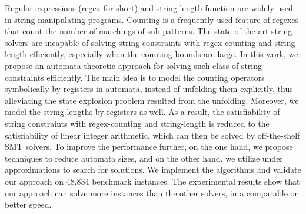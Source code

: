 
%

Regular expressions (regex for short) and string-length function are widely used in string-manipulating programs. 
Counting is a frequently used feature of regexes that count the number of matchings of sub-patterns. The state-of-the-art string solvers are incapable of solving string constraints with regex-counting and string-length efficiently, especially when the counting bounds are large. In this work, we propose an automata-theoretic approach for solving such class of string constraints efficiently. 
%
The main idea is to model the counting operators symbolically by registers in automata, instead of unfolding them explicitly, thus alleviating the state explosion problem resulted from the unfolding.  
%
Moreover, we model the string lengths by registers as well. 
As a result, the satisfiability of string constraints with regex-counting and string-length is reduced to the satisfiability of linear integer arithmetic, which can then be solved by off-the-shelf SMT solvers. 
%
%
To improve the performance further, on the one hand, we propose techniques to reduce automata sizes, 
and on the other hand, we utilize under approximations to search for solutions.   
We implement the algorithms and validate our approach on 48,834 benchmark instances. The experimental results show that 
our approach can solve more instances than the other solvers, in a comparable or better speed.



%